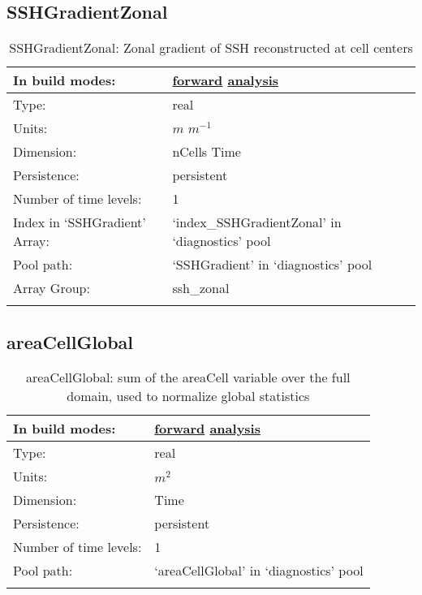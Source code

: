 \subsection[SSHGradientZonal]{SSHGradientZonal}
\label{subsec:var_sec_diagnostics_SSHGradientZonal}
\begin{center}
\begin{longtable}{| p{2.0in} | p{4.0in} |}
        \hline 
        In build modes: & \hyperref[subsec:forward_var_tab_diagnostics]{forward} \hyperref[subsec:analysis_var_tab_diagnostics]{analysis} \\
        \hline 
        Type: & real \\
        \hline 
        Units: & $m$ $m^{-1}$ \\
        \hline 
        Dimension: & nCells Time \\
        \hline 
        Persistence: & persistent \\
        \hline 
        Number of time levels: & 1 \\
        \hline 
		 Index in `SSHGradient' Array: & `index\_SSHGradientZonal' in `diagnostics' pool \\
		 \hline 
            Pool path: & `SSHGradient' in `diagnostics' pool \\
		 \hline 
		 Array Group: & ssh\_zonal \\
		 \hline 
    \caption{SSHGradientZonal: Zonal gradient of SSH reconstructed at cell centers}
\end{longtable}
\end{center}
\subsection[areaCellGlobal]{areaCellGlobal}
\label{subsec:var_sec_diagnostics_areaCellGlobal}
\begin{center}
\begin{longtable}{| p{2.0in} | p{4.0in} |}
        \hline 
        In build modes: & \hyperref[subsec:forward_var_tab_diagnostics]{forward} \hyperref[subsec:analysis_var_tab_diagnostics]{analysis} \\
        \hline 
        Type: & real \\
        \hline 
        Units: & $m^2$ \\
        \hline 
        Dimension: & Time \\
        \hline 
        Persistence: & persistent \\
        \hline 
        Number of time levels: & 1 \\
        \hline 
            Pool path: & `areaCellGlobal' in `diagnostics' pool \\
		 \hline 
    \caption{areaCellGlobal: sum of the areaCell variable over the full domain, used to normalize global statistics}
\end{longtable}
\end{center}
